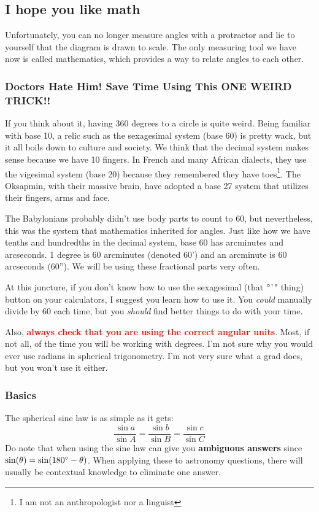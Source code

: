 \documentclass{article}
\begin{document}
\subsection{I hope you like math}
Unfortunately, you can no longer measure angles with a protractor and lie to yourself that the diagram is drawn to scale. The only measuring tool we have now is called mathematics, which provides a way to relate angles to each other.

\subsubsection{Doctors Hate Him! Save Time Using This ONE WEIRD TRICK!!}
If you think about it, having 360 degrees to a circle is quite weird. Being familiar with base 10, a relic such as the sexagesimal system (base 60) is pretty wack, but it all boils down to culture and society. We think that the decimal system makes sense because we have 10 fingers. In French and many African dialects, they use the vigesimal system (base 20) because they remembered they have toes\footnote{I am not an anthropologist nor a linguist}. The Oksapmin, with their massive brain, have adopted a base 27 system that utilizes their fingers, arms and face.

The Babylonians probably didn't use body parts to count to 60, but nevertheless, this was the system that mathematics inherited for angles. Just like how we have tenths and hundredths in the decimal system, base 60 has arcminutes and arcseconds. 1 degree is 60 arcminutes (denoted 60') and an arcminute is 60 arcseconds (60''). We will be using these fractional parts very often.

At this juncture, if you don't know how to use the sexagesimal (that ${}^{\circ}$'\," thing) button on your calculators, I suggest you learn how to use it. You \textit{could} manually divide by 60 each time, but you \textit{should} find better things to do with your time.

Also, \textbf{\textcolor{red}{always check that you are using the correct angular units}}. Most, if not all, of the time you will be working with degrees. I'm not sure why you would ever use radians in spherical trigonometry. I'm not very sure what a grad does, but you won't use it either.

\subsubsection{Basics}
The spherical sine law is as simple as it gets:
\begin{equation}
    \frac{\sin a}{\sin A} = \frac{\sin b}{\sin B} = \frac{\sin c}{\sin C}
\end{equation}
Do note that when using the sine law can give you \textbf{ambiguous answers} since $\sin(\theta) = \sin(180{}^{\circ} - \theta)$. When applying these to astronomy questions, there will usually be contextual knowledge to eliminate one answer.
\end{document}
